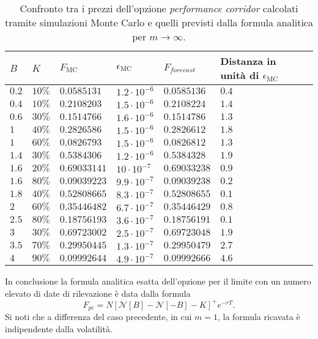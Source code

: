 \begin{table}[t]
\small
\centering
\begin{tabular}{|l|l|l|l|l|l|l|l|}
\hline
$B$ & $K$ & $F_\text{MC}$ & $\epsilon_\text{MC}$ & $F_{forecast}$ & Distanza in unità di $\epsilon_\text{MC}$ \\
\hline \hline
$0.2$ & $10\%$ & $0.0585131$ & $1.2 \cdot 10^{-6}$ & $0.0585136$ & $0.4$\\ \hline
$0.4$ & $10\%$ & $0.2108203$ & $1.5 \cdot 10^{-6}$ & $0.2108224$ & $1.4$\\ \hline
$0.6$ & $30\%$ & $0.1514766$ & $1.6 \cdot 10^{-6}$ & $0.1514786$ & $1.3$\\ \hline
$1$ & $40\%$ & $0.2826586$ & $1.5 \cdot 10^{-6}$ & $0.2826612$ & $1.8$\\ \hline
$1$ & $60\%$ & $0.0826793$ & $1.5 \cdot 10^{-6}$ & $0.0826812$ & $1.3$\\ \hline
$1.4$ & $30\%$ & $0.5384306$ & $1.2 \cdot 10^{-6}$ & $0.5384328$ & $1.9$\\ \hline
$1.6$ & $20\%$ & $0.69033141$ & $10 \cdot 10^{-7}$ & $0.69033238$ & $0.9$\\ \hline
$1.6$ & $80\%$ & $0.09039223$ & $9.9 \cdot 10^{-7}$ & $0.09039238$ & $0.2$\\ \hline
$1.8$ & $40\%$ & $0.52808665$ & $8.3 \cdot 10^{-7}$ & $0.52808655$ & $0.1$\\ \hline
$2$ & $60\%$ & $0.35446482$ & $6.7 \cdot 10^{-7}$ & $0.35446429$ & $0.8$\\ \hline
$2.5$ & $80\%$ & $0.18756193$ & $3.6 \cdot 10^{-7}$ & $0.18756191$ & $0.1$\\ \hline
$3$ & $30\%$ & $0.69723002$ & $2.5 \cdot 10^{-7}$ & $0.69723048$ & $1.9$\\ \hline
$3.5$ & $70\%$ & $0.29950445$ & $1.3 \cdot 10^{-7}$ & $0.29950479$ & $2.7$\\ \hline
$4$ & $90\%$ & $0.09992644$ & $4.9 \cdot 10^{-7}$ & $0.09992666$ & $4.6$\\ \hline
\end{tabular}
\caption{Confronto tra i prezzi dell'opzione \textit{performance corridor} calcolati tramite simulazioni Monte Carlo e quelli previsti dalla formula analitica per $m \rightarrow \infty$.}
\label{tab:Teo-MC_m_inf}
\end{table}

In conclusione la formula analitica esatta dell'opzione per il limite con un numero elevato di date di rilevazione è data dalla formula
\begin{equation}
    F_{pc}=N[\mathcal{N}[B] - \mathcal{N}[-B]-K]^{+} e^{-rT}.
\end{equation}
Si noti che a differenza del caso precedente, in cui $m=1$, la formula ricavata è indipendente dalla volatilità.

